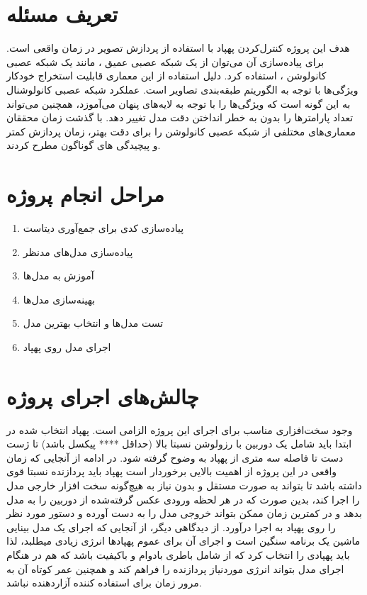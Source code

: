 \section{تعریف مسئله}
هدف این پروژه کنترل‌کردن پهپاد با استفاده از پردازش تصویر در زمان واقعی است. برای پیاده‌سازی آن می‌توان از یک شبکه عصبی عمیق 
، مانند یک شبکه عصبی کانولوشن  ، استفاده کرد. دلیل استفاده از این معماری قابلیت استخراج خودکار ویژگی‌ها با توجه به الگوریتم طبقه‌بندی تصاویر
است. عملکرد شبکه عصبی کانولوشنال به این گونه است که ویژگی‌ها را با توجه به لایه‌های پنهان می‌آموزد، همچنین می‌تواند تعداد پارامترها را بدون به خطر انداختن دقت مدل تغییر دهد. با گذشت زمان محققان 
معماری‌های مختلفی از شبکه عصبی کانولوشن را برای دقت بهتر، زمان پردازش کمتر و پیچیدگی های  گوناگون مطرح کردند. 

\section{مراحل انجام پروژه}
\begin{enumerate}
    \item  {پیاده‌سازی کدی برای جمع‌آوری دیتاست}
    \item  {پیاده‌سازی مدل‌های مدنظر}
    \item  {آموزش به مدل‌ها}
    \item  {بهینه‌سازی مدل‌ها}
    \item  {تست مدل‌ها و انتخاب بهترین مدل}
    \item  {اجرای مدل روی پهپاد}
\end{enumerate}

\section{چالش‌های اجرای پروژه}
وجود سخت‌افزاری مناسب برای اجرای این پروژه الزامی است. پهپاد انتخاب شده در ابتدا باید شامل یک دوربین با رزولوشن نسبتا بالا (حداقل **** پیکسل باشد) تا  ژست دست تا فاصله سه متری از پهپاد به وضوح گرفته شود.
در ادامه از آنجایی که زمان واقعی در این پروژه از اهمیت بالایی برخوردار است پهپاد باید پردازنده نسبتا قوی داشته باشد تا بتواند به صورت مستقل و بدون نیاز به هیچ‌گونه سخت افزار خارجی مدل را اجرا کند، 
بدین صورت که در هر لحظه ورودی عکس گرفته‌شده از دوربین را به مدل بدهد و در کمترین زمان ممکن بتواند خروجی مدل را به دست آورده و دستور مورد نظر را روی 
پهپاد به اجرا درآورد. از دیدگاهی دیگر، از آنجایی که اجرای یک مدل بینایی ماشین یک برنامه سنگین است و اجرای آن برای عموم پهپاد‌ها انرژی زیادی میطلبد، لذا باید پهپادی را انتخاب کرد
که از شامل باطری بادوام و باکیفیت باشد که هم در هنگام اجرای مدل بتواند انرژی مورد‌نیاز پردازنده را فراهم کند و همچنین عمر کوتاه آن به مرور زمان برای استفاده کننده آزاردهنده نباشد.

